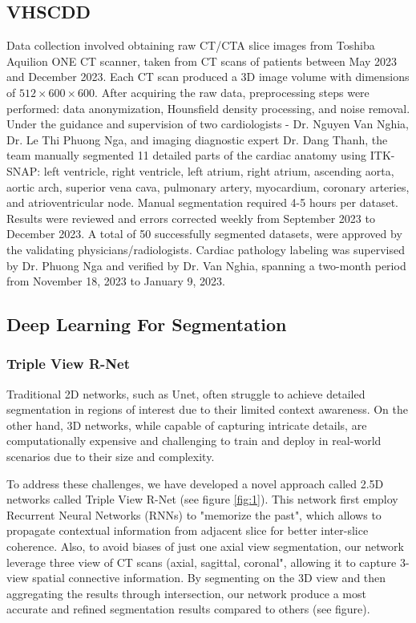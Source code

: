 \documentclass{article}
\begin{document}
\begin{multicols}{2}
\subsection{VHSCDD}
Data collection involved obtaining raw CT/CTA slice images from Toshiba Aquilion ONE CT scanner, taken from CT scans of patients between May 2023 and December 2023. Each CT scan produced a 3D image volume with dimensions of $512 \times 600 \times 600$. After acquiring the raw data, preprocessing steps were performed: data anonymization, Hounsfield density processing, and noise removal. Under the guidance and supervision of two cardiologists - Dr. Nguyen Van Nghia, Dr. Le Thi Phuong Nga, and imaging diagnostic expert Dr. Dang Thanh, the team manually segmented 11 detailed parts of the cardiac anatomy using ITK-SNAP: left ventricle, right ventricle, left atrium, right atrium, ascending aorta, aortic arch, superior vena cava, pulmonary artery, myocardium, coronary arteries, and atrioventricular node. Manual segmentation required 4-5 hours per dataset. Results were reviewed and errors corrected weekly from September 2023 to December 2023. A total of 50 successfully segmented datasets, were approved by the validating physicians/radiologists. Cardiac pathology labeling was supervised by Dr. Phuong Nga and verified by Dr. Van Nghia, spanning a two-month period from November 18, 2023 to January 9, 2023.

\subsection{Deep Learning For Segmentation}
\subsubsection{Triple View R-Net}
Traditional 2D networks, such as Unet, often struggle to achieve detailed segmentation in regions of interest due to their limited context awareness. On the other hand, 3D networks, while capable of capturing intricate details, are computationally expensive and challenging to train and deploy in real-world scenarios due to their size and complexity.

To address these challenges, we have developed a novel approach called 2.5D networks called Triple View R-Net (see figure \ref{fig:1}). This network first employ Recurrent Neural Networks (RNNs) to "memorize the past", which allows to propagate contextual information from adjacent slice for better inter-slice coherence. Also, to avoid biases of just one axial view segmentation, our network leverage three view of CT scans (axial, sagittal, coronal", allowing it to capture 3-view spatial connective information. By segmenting on the 3D view and then aggregating the results through intersection, our network produce a most accurate and refined segmentation results compared to others (see figure).


\end{multicols}
\end{document}
